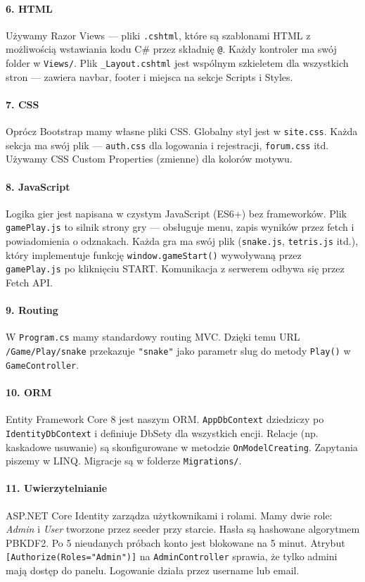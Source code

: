 \documentclass[12pt,a4paper]{article}
\newcommand{\code}[1]{\texttt{\small#1}}
\begin{document}
\paragraph{6. HTML}
Używamy Razor Views --- pliki \code{.cshtml}, które są szablonami HTML z możliwością wstawiania kodu C\#
przez składnię \code{@}. Każdy kontroler ma swój folder w \code{Views/}. Plik \code{\_Layout.cshtml} jest
wspólnym szkieletem dla wszystkich stron --- zawiera navbar, footer i miejsca na sekcje Scripts i Styles.

\paragraph{7. CSS}
Oprócz Bootstrap mamy własne pliki CSS. Globalny styl jest w \code{site.css}. Każda sekcja ma swój plik ---
\code{auth.css} dla logowania i rejestracji, \code{forum.css} itd. Używamy CSS Custom Properties (zmienne)
dla kolorów motywu.

\paragraph{8. JavaScript}
Logika gier jest napisana w czystym JavaScript (ES6+) bez frameworków. Plik \code{gamePlay.js} to silnik
strony gry --- obsługuje menu, zapis wyników przez fetch i powiadomienia o odznakach. Każda gra ma swój plik
(\code{snake.js}, \code{tetris.js} itd.), który implementuje funkcję \code{window.gameStart()} wywoływaną
przez \code{gamePlay.js} po kliknięciu START. Komunikacja z serwerem odbywa się przez Fetch API.

\paragraph{9. Routing}
W \code{Program.cs} mamy standardowy routing MVC. Dzięki temu URL \code{/Game/Play/snake} przekazuje
\texttt{"snake"} jako parametr slug do metody \code{Play()} w \code{GameController}.

\paragraph{10. ORM}
Entity Framework Core 8 jest naszym ORM. \code{AppDbContext} dziedziczy po \code{IdentityDbContext}
i definiuje DbSety dla wszystkich encji. Relacje (np. kaskadowe usuwanie) są skonfigurowane w metodzie
\code{OnModelCreating}. Zapytania piszemy w LINQ. Migracje są w folderze \code{Migrations/}.

\paragraph{11. Uwierzytelnianie}
ASP.NET Core Identity zarządza użytkownikami i rolami. Mamy dwie role: \textit{Admin} i \textit{User}
tworzone przez seeder przy starcie. Hasła są hashowane algorytmem PBKDF2. Po 5 nieudanych próbach konto
jest blokowane na 5 minut. Atrybut \code{[Authorize(Roles="Admin")]} na \code{AdminController} sprawia,
że tylko admini mają dostęp do panelu. Logowanie działa przez username lub email.
\end{document}
